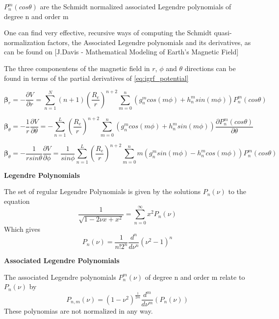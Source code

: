 $P_n^m(cos \theta)$ are the Schmidt normalized associated Legendre polynomials of degree n and order m

One can find very effective, recursive ways of computing the Schmidt quasi-normalization factors, the Associated Legendre polynomials and its derivatives, as can be found on [J.Davis - Mathematical Modeling of Earth’s Magnetic Field] %

The three componentens of the magnetic field in $r$, $\phi$ and $\theta$ directions can be found in terms of the partial derivatives of \ref{eq:igrf_potential}

\begin{equation}
{\bm \beta}_r = -\dfrac{\partial V}{\partial r} = \sum_{n=1}^{N} (n+1) \left(\dfrac{R_e}{r}\right)^{n+2} \sum_{m=0}^{n} \left(g_n^m cos(m\phi) + h_n^m sin(m\phi)\right) P_n^m(cos\theta)
\end{equation}

\begin{equation}
{\bm \beta}_{\theta} = -\dfrac{1}{r} \dfrac{\partial V}{\partial \theta} = 
-\sum_{n=1}^{L} \left(\dfrac{R_e}{r}\right)^{n+2} \sum_{m=0}^{n} \left(g_n^m cos(m\phi) + h_n^m sin(m\phi)\right) \dfrac{\partial P_n^m(cos\theta)}{\partial \theta}
\end{equation}

\begin{equation}
{\bm \beta}_{\theta} = -\dfrac{1}{r sin\theta} \dfrac{\partial V}{\partial \phi} = 
\dfrac{1}{sin\phi}\sum_{n=1}^{L} \left(\dfrac{R_e}{r}\right)^{n+2} \sum_{m=0}^{n} m\left(g_n^m sin(m\phi) - h_n^m cos(m\phi)\right) P_n^m(cos\theta)
\end{equation}

{\bf Legendre Polynomials}

The set of regular Legendre Polynomials is given by the solutions $P_n(\nu)$ to the equation
\begin{equation}
\dfrac{1}{\sqrt{1-2\nu x + x^2}} = \sum_{n=0}^\infty x^2 P_n(\nu)
\end{equation}
Which gives
\begin{equation}
P_n(\nu) = \dfrac{1}{n! 2^n} \dfrac{d^n}{d\nu^n} (\nu^2 -1)^n
\end{equation}

{\bf Associated Legendre Polynomials}

The associated Legendre polynomials $P_n^m(\nu)$ of degree n and order m relate to $P_n(\nu)$ by
\begin{equation}
P_{n,m}(\nu) = (1-\nu^2)^{\frac{1}{2m}} \dfrac{d^m}{d\nu^m}(P_n(\nu))
\end{equation}
These polynomias are not normalized in any way. 

